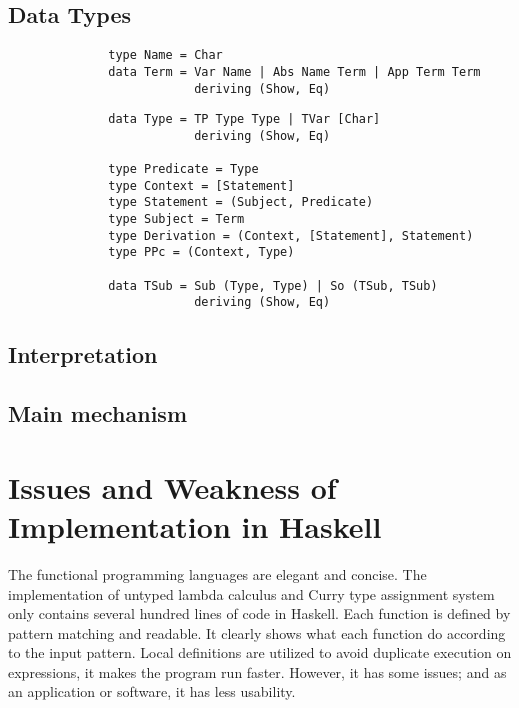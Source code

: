 \subsection{Data Types}

\begin{verbatim}
              type Name = Char  
              data Term = Var Name | Abs Name Term | App Term Term
                          deriving (Show, Eq)
\end{verbatim}



\begin{verbatim}
              data Type = TP Type Type | TVar [Char]
                          deriving (Show, Eq)
            
              type Predicate = Type
              type Context = [Statement]
              type Statement = (Subject, Predicate)
              type Subject = Term
              type Derivation = (Context, [Statement], Statement)
              type PPc = (Context, Type)

              data TSub = Sub (Type, Type) | So (TSub, TSub)
                          deriving (Show, Eq)
\end{verbatim}

\subsection{Interpretation}


\subsection{Main mechanism}




\section{Issues and Weakness of Implementation in Haskell }

The functional programming languages are elegant and concise. The implementation of untyped lambda calculus and Curry type assignment system only contains several hundred lines of code in Haskell. Each function is defined by pattern matching and readable. It clearly shows what each function do according to the input pattern. Local definitions are utilized to avoid duplicate execution on expressions, it makes the program run faster. However, it has some issues; and as an application or software, it has less usability.






   


